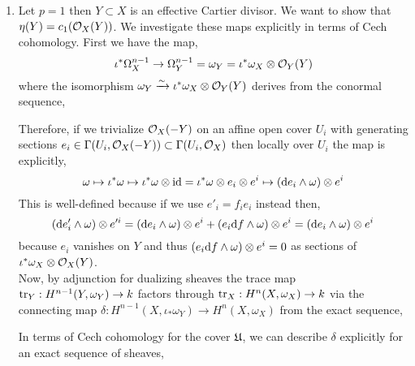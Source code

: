 \documentclass[12pt]{article}
\begin{document}
\begin{enumerate}
\item Let $p = 1$ then $Y \subset X$ is an effective Cartier divisor. We want to show that $\eta(Y) = c_1(\mathcal{O}_{X}(Y))$. We investigate these maps explicitly in terms of Cech cohomology. First we have the map,
\[ \iota^* \Omega^{n-1}_X \to \Omega^{n-1}_Y = \omega_Y = \iota^* \omega_X \otimes \mathcal{O}_{Y}(Y) \]
where the isomorphism $\omega_Y \xrightarrow{\sim} \iota^* \omega_X \otimes \mathcal{O}_{Y}(Y)$
derives from the conormal sequence,
\begin{center}
\end{center}
Therefore, if we trivialize $\mathcal{O}_{X}(-Y)$ on an affine open cover $U_i$ with generating sections $e_i \in \Gamma(U_i, \mathcal{O}_{X}(-Y)) \subset \Gamma(U_i, \mathcal{O}_{X})$ then locally over $U_i$ the map is explicitly,
\[ \omega \mapsto \iota^* \omega \mapsto \iota^* \omega \otimes \mathrm{id} = \iota^* \omega \otimes e_i \otimes e^i \mapsto (\mathrm{d}{e_i} \wedge \omega) \otimes e^i \]
This is well-defined because if we use $e'_i = f_i e_i$ instead then,
\[ (\mathrm{d}{e_i'} \wedge \omega) \otimes e'^i = (\mathrm{d}{e_i} \wedge \omega) \otimes e^i + (e_i \mathrm{d}{f} \wedge \omega )\otimes e^i = (\mathrm{d}{e_i} \wedge \omega) \otimes e^i \]
because $e_i$ vanishes on $Y$ and thus $(e_i \mathrm{d}{f} \wedge \omega) \otimes e^i = 0$ as sections of $\iota^* \omega_X \otimes \mathcal{O}_{X}(Y)$.
\bigskip\\
Now, by adjunction for dualizing sheaves the trace map $\mathrm{tr}_Y : H^{n-1}(Y, \omega_Y) \to k$ factors through $\mathrm{tr}_X : H^n(X, \omega_X) \to k$ via the connecting map $\delta : H^{n-1}(X, \iota_* \omega_Y) \to H^n(X, \omega_X)$ from the exact sequence,
\begin{center}
\end{center}
In terms of Cech cohomology for the cover $\mathfrak{U}$, we can describe $\delta$ explicitly for an exact sequence of sheaves,
\begin{center}
\end{center} 

\end{enumerate}
\end{document}
